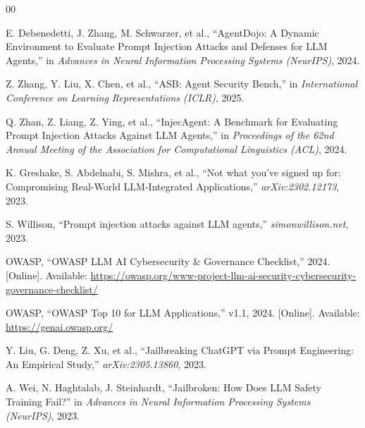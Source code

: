 \documentclass[conference]{IEEEtran}
\begin{document}
\begin{thebibliography}{00}

 E. Debenedetti, J. Zhang, M. Schwarzer, et al., ``AgentDojo: A Dynamic Environment to Evaluate Prompt Injection Attacks and Defenses for LLM Agents,'' in \textit{Advances in Neural Information Processing Systems (NeurIPS)}, 2024.

 Z. Zhang, Y. Liu, X. Chen, et al., ``ASB: Agent Security Bench,'' in \textit{International Conference on Learning Representations (ICLR)}, 2025.

 Q. Zhan, Z. Liang, Z. Ying, et al., ``InjecAgent: A Benchmark for Evaluating Prompt Injection Attacks Against LLM Agents,'' in \textit{Proceedings of the 62nd Annual Meeting of the Association for Computational Linguistics (ACL)}, 2024.

 K. Greshake, S. Abdelnabi, S. Mishra, et al., ``Not what you've signed up for: Compromising Real-World LLM-Integrated Applications,'' \textit{arXiv:2302.12173}, 2023.

 S. Willison, ``Prompt injection attacks against LLM agents,'' \textit{simonwillison.net}, 2023.

 OWASP, ``OWASP LLM AI Cybersecurity \& Governance Checklist,'' 2024. [Online]. Available: \url{https://owasp.org/www-project-llm-ai-security-cybersecurity-governance-checklist/}

 OWASP, ``OWASP Top 10 for LLM Applications,'' v1.1, 2024. [Online]. Available: \url{https://genai.owasp.org/}

 Y. Liu, G. Deng, Z. Xu, et al., ``Jailbreaking ChatGPT via Prompt Engineering: An Empirical Study,'' \textit{arXiv:2305.13860}, 2023.

 A. Wei, N. Haghtalab, J. Steinhardt, ``Jailbroken: How Does LLM Safety Training Fail?'' in \textit{Advances in Neural Information Processing Systems (NeurIPS)}, 2023.

\end{thebibliography}
\end{document}

